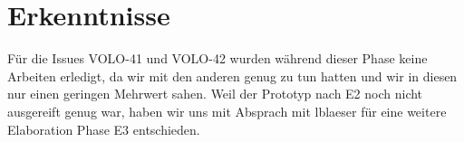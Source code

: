 	\section{Erkenntnisse}
	Für die Issues VOLO-41 und VOLO-42 wurden während dieser Phase keine Arbeiten erledigt, da wir mit den anderen genug zu tun hatten und wir in diesen nur einen geringen Mehrwert sahen.
	Weil der Prototyp nach E2 noch nicht ausgereift genug war, haben wir uns mit Absprach mit lblaeser für eine weitere Elaboration Phase E3 entschieden.
